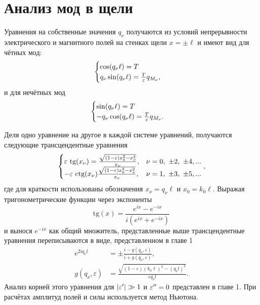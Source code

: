 \newpage
\appendix
\chapter{Анализ мод в щели}
Уравнения на собственные значения $q_\nu$ получаются из условий непрерывности электрического и магнитного полей на стенках щели $x = \pm \ell$ и имеют вид для чётных мод:
\begin{equation}
    \begin{cases}
        \cos(q_\nu \ell) = T \\
        q_\nu \sin (q_\nu \ell)  = \frac{T}{\varepsilon} q_{M_\nu},
    \end{cases}
    \label{eq:roots_even_ap}
\end{equation}
и для нечётных мод
\begin{equation}
    \begin{cases}
        \sin(q_\nu \ell) = T \\
        -q_\nu \cos (q_\nu \ell)  = \frac{T}{\varepsilon} q_{M_\nu}. 
    \end{cases}
    \label{eq:roots_odd_ap}
\end{equation}

Деля одно уравнение на другое в каждой системе уравнений, получаются следующие трансцендентные уравнения
\begin{equation}
    \begin{cases}
        \varepsilon\ \text{tg}(x_\nu) = \frac{\sqrt{(1-\varepsilon)x_0^2  - x_\nu^2}}{x_\nu}, & \nu = 0,\ \pm 2,\ \pm 4, ... \\
        -\varepsilon\ \text{ctg}(x_\nu) \frac{\sqrt{(1-\varepsilon)x_0^2 - x_\nu^2}}{x_\nu}, & \nu = 1,\ \pm 3,\ \pm 5, ... \\
    \end{cases},
\end{equation}
где для краткости использованы обозначения $x_\nu = q_\nu \ell$ и $x_0 = k_0 \ell$. Выражая тригонометрические функции через экспоненты
\begin{equation*}
     \text{tg}(x) = \frac{e^{i x} - e^{-i x}}{i (e^{i x} + e^{-i x})}
\end{equation*}
и вынося $e^{-ix}$ как общий множитель, представленные выше трансцендентные уравнения переписываются в виде, представленном в главе 1
\begin{align}
e^{2i q_\nu l} &= \pm \frac{i-g(q_\nu,\varepsilon)}{i+g(q_\nu,\varepsilon)},\label{eq:BoundCond_ap} \\
g(q_\nu,\varepsilon) & = \frac{\sqrt{(1-\varepsilon)(k_0 \ell)^2 - (q_\nu l)^2}}{\varepsilon q_\nu l}.  \nonumber
\end{align}
Анализ корней этого уравнения для $\lvert\varepsilon'\rvert\gg 1$ и $\varepsilon'' = 0$ представлен в главе 1. При расчётах амплитуд полей и силы используется метод Ньютона. 

